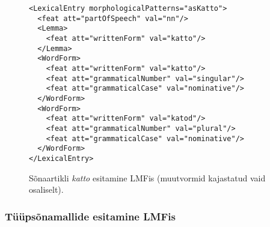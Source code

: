 \documentclass[12pt,a4paper]{article}
\begin{document}
\begin{figure}[p]
  \center
\begin{verbatim}
<LexicalEntry morphologicalPatterns="asKatto">
  <feat att="partOfSpeech" val="nn"/>
  <Lemma>
    <feat att="writtenForm" val="katto"/>
  </Lemma>
  <WordForm>
    <feat att="writtenForm" val="katto"/>
    <feat att="grammaticalNumber" val="singular"/>
    <feat att="grammaticalCase" val="nominative"/>
  </WordForm>
  <WordForm>
    <feat att="writtenForm" val="katod"/>
    <feat att="grammaticalNumber" val="plural"/>
    <feat att="grammaticalCase" val="nominative"/>
  </WordForm>
</LexicalEntry>
\end{verbatim}
\caption{Sõnaartikli \textit{katto} esitamine LMFis (muutvormid kajastatud vaid osaliselt).
  \label{code:lmf-lexicalentry}}
\end{figure}





\subsubsection{Tüüpsõnamallide esitamine LMFis}
\end{document}
